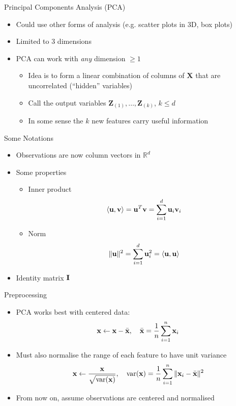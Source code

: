 \documentclass{beamer}
\begin{document}
\begin{frame}{Principal Components Analysis (PCA)} 
\begin{itemize} 
 \item Could use other forms of analysis (e.g. scatter plots in 3D, box plots) 
 \item Limited to 3 dimensions 
 \item PCA can work with \emph{any} dimension $\geq 1$
 \begin{itemize} 
 \item Idea is to form a linear combination of columns of $\textbf{X}$ that are uncorrelated (``hidden'' variables)
 \item Call the output variables $\textbf{Z}_{(1)}, \ldots, \textbf{Z}_{(k)}$, $k \leq d$
 \item In some sense the $k$ new features carry useful information 
 \end{itemize}
\end{itemize}
\end{frame}

\begin{frame}{Some Notations}
\begin{itemize} 
 \item Observations are now column vectors in $\mathbb{R}^d$
 \item Some properties 
 \begin{itemize}
 \item Inner product 
 \begin{displaymath} 
  \langle \textbf{u}, \textbf{v} \rangle = \textbf{u}^T\textbf{v} = \sum_{i=1}^d \textbf{u}_i \textbf{v}_i
 \end{displaymath}
 \item Norm 
 \begin{displaymath} 
  \|\textbf{u}\|^2 = \sum_{i=1}^d \textbf{u}_i^2 = \langle \textbf{u}, \textbf{u} \rangle
 \end{displaymath}
 \end{itemize} 
 \item Identity matrix $\textbf{I}$
\end{itemize}
\end{frame}


\begin{frame}{Preprocessing} 
\begin{itemize} 
 \item PCA works best with centered data: 
 \begin{displaymath} 
  \textbf{x} \leftarrow \textbf{x} - \bar{\textbf{x}}, \quad  \bar{\textbf{x}} = \frac{1}{n}\sum_{i=1}^n \textbf{x}_i
 \end{displaymath}
\item Must also normalise the range of each feature to have unit variance 
\begin{displaymath}
 \textbf{x} \leftarrow \frac{\textbf{x}}{\sqrt{\mbox{var}(\textbf{x})}}, \quad \mbox{var}(\textbf{x}) = \frac{1}{n}\sum_{i=1}^n \|\textbf{x}_i - \bar{\textbf{x}}\|^2
\end{displaymath}

\item From now on, assume observations are centered and normalised 
\end{itemize}
\end{frame}
\end{document}
